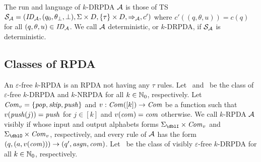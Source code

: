 The run and language of $k$-DRPDA ${\cal A}$ is those of TS
${\cal S}_{\cal A}=(\mathit{ID}_{\cal A}, (q_0, \theta_\bot, \bot), \Sigma\times D, \{\tau\}\times D, \Rightarrow_{\cal A}, c')$ where
$c'((q,\theta,u))=c(q)$ for all $(q,\theta,u)\in\mathit{ID}_{\cal A}$.
We call ${\cal A}$ deterministic, or $k$-DRPDA, if ${\cal S}_{\cal A}$ is deterministic.

\subsection{Classes of RPDA}
An $\varepsilon$-free $k$-RPDA is an RPDA not having any $\tau$ rules.
Let \DRPDA\ and \NRPDA\ be the class of $\varepsilon$-free $k$-DRPDA and $k$-NRPDA for all $k\in\mathbb{N}_0$, respectively.
Let $\mathit{Com}_v=\{\mathit{pop},\mathit{skip},\mathit{push}\}$ and $v:\mathit{Com}([k])\to\mathit{Com}$ be a function such that $v(\mathit{push}(j))=\mathit{push}$ for $j\in[k]$ and $v(\mathit{com})=\mathit{com}$ otherwise.
We call $k$-RPDA ${\cal A}$ visibly if whose input and output alphabets forms $\Sigma_\dblI\times\Com_v$ and $\Sigma_\dblO\times\Com_v$, respectively,
and every rule of ${\cal A}$ has the form $(q,(a,v(\mathit{com})))\to(q',\mathit{asgn},\mathit{com})$.
Let \DRPDAv\ be the class of visibly $\varepsilon$-free $k$-DRPDA for all $k\in\mathbb{N}_0$, respectively.
